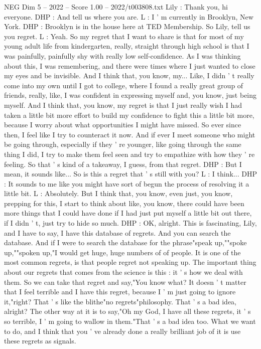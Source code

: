 \begin{textsample}{NEG Dim 5 – 2022 – Score 1.00 – 2022/t003808.txt}
Lily : Thank you, hi everyone.
DHP : And tell us where you are.
L : I ' m currently in Brooklyn, New York.
DHP : Brooklyn is in the house here at TED Membership.
So Lily, tell us you regret.
L : Yeah.
So my regret that I want to share is that for most of my young adult life from kindergarten, really, straight through high school is that I was painfully, painfully shy with really low self-confidence.
As I was thinking about this, I was remembering, and there were times where I just wanted to close my eyes and be invisible.
And I think that, you know, my...
Like, I didn ' t really come into my own until I got to college, where I found a really great group of friends, really, like, I was confident in expressing myself and, you know, just being myself.
And I think that, you know, my regret is that I just really wish I had taken a little bit more effort to build my confidence to fight this a little bit more, because I worry about what opportunities I might have missed.
So ever since then, I feel like I try to counteract it now.
And if ever I meet someone who might be going through, especially if they ' re younger, like going through the same thing I did, I try to make them feel seen and try to empathize with how they ' re feeling.
So that ' s kind of a takeaway, I guess, from that regret.
DHP : But I mean, it sounds like...
So is this a regret that ' s still with you?
L : I think...
DHP : It sounds to me like you might have sort of begun the process of resolving it a little bit.
L : Absolutely.
But I think that, you know, even just, you know, prepping for this, I start to think about like, you know, there could have been more things that I could have done if I had just put myself a little bit out there, if I didn ' t, just try to hide so much.
DHP : OK, alright.
This is fascinating, Lily, and I have to say, I have this database of regrets.
And you can search the database.
And if I were to search the database for the phrase"speak up,""spoke up,""spoken up,"I would get huge, huge numbers of of people.
It is one of the most common regrets, is that people regret not speaking up.
The important thing about our regrets that comes from the science is this : it ' s how we deal with them.
So we can take that regret and say,"You know what?
It doesn ' t matter that I feel terrible and I have this regret, because I ' m just going to ignore it,"right?
That ' s like the blithe"no regrets"philosophy.
That ' s a bad idea, alright?
The other way at it is to say,"Oh my God, I have all these regrets, it ' s so terrible, I ' m going to wallow in them."That ' s a bad idea too.
What we want to do, and I think that you ' ve already done a really brilliant job of it is use these regrets as signals.

\end{textsample}
